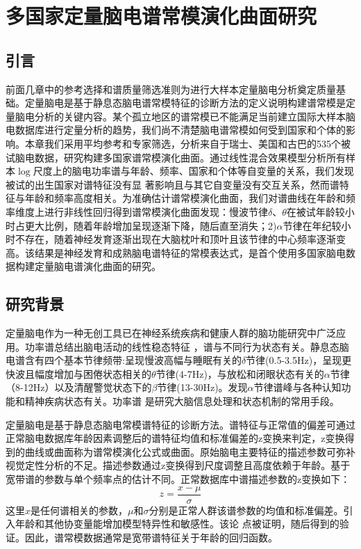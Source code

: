 \chapter{多国家定量脑电谱常模演化曲面研究}
\section{引言}
前面几章中的参考选择和谱质量筛选准则为进行大样本定量脑电分析奠定质量基础。定量脑电是基于静息态脑电谱常模特征的诊断方法的定义说明构建谱常模是定量脑电分析的关键内容。某个孤立地区的谱常模已不能满足当前建立国际大样本脑电数据库进行定量分析的趋势，我们尚不清楚脑电谱常模如何受到国家和个体的影响。本章我们采用平均参考和专家筛选，分析来自于瑞士、美国和古巴的535个被试脑电数据，研究构建多国家谱常模演化曲面。通过线性混合效果模型分析所有样本$\log$尺度上的脑电功率谱与年龄、频率、国家和个体等自变量的关系，我们发现被试的出生国家对谱特征没有显
著影响且与其它自变量没有交互关系，然而谱特征与年龄和频率高度相关。为准确估计谱常模演化曲面，我们对谱曲线在年龄和频率维度上进行非线性回归得到谱常模演化曲面发现：慢波节律$\delta$、$\theta$在被试年龄较小时占更大比例，随着年龄增加呈现逐渐下降，随后直至消失；2)$\alpha$节律在年纪较小时不存在，随着神经发育逐渐出现在大脑枕叶和顶叶且该节律的中心频率逐渐变高。该结果是神经发育和成熟脑电谱特征的常模表达式，是首个使用多国家脑电数据构建定量脑电谱演化曲面的研究。

\section{研究背景}
定量脑电作为一种无创工具已在神经系统疾病和健康人群的脑功能研究中广泛应用。功率谱总结出脑电活动的线性稳态特征
，谱与不同行为状态有关。静息态脑电谱含有四个基本节律频带:呈现慢波高幅与睡眠有关的$\delta$节律(0.5-3.5Hz)，呈现更快波且幅度增加与困倦状态相关的$\theta$节律(4-7Hz)，与放松和闭眼状态有关的$\alpha$节律（8-12Hz）以及清醒警觉状态下的$\beta$节律(13-30Hz)。\cite{john1988neurometrics,buzsaki2006rhythms}发现$\alpha$节律谱峰与各种认知功能和精神疾病状态有关。功率谱
是研究大脑信息处理和状态机制的常用手段。

定量脑电是基于静息态脑电常模谱特征的诊断方法。谱特征与正常值的偏差可通过正常脑电数据库年龄因素调整后的谱特征均值和标准偏差的z变换来判定，z变换得到的曲线或曲面称为谱常模演化公式或曲面。原始脑电主要特征的描述参数可弥补视觉定性分析的不足。描述参数通过z变换得到尺度调整且高度依赖于年龄。基于宽带谱的参数与单个频率点的估计不同。正常数据库中谱描述参数的z变换如下：
\[z=\frac{x-\mu}{\sigma}\]
这里$x$是任何谱相关的参数，$\mu$和$\sigma$分别是正常人群该谱参数的均值和标准偏差。引入年龄和其他协变量能增加模型特异性和敏感性。该论
点被\cite{john1980developmental}证明，随后得到\cite{matouvsek1973automatic,john1977neurometrics,alvarez1987eeg,amador1989structure}的验证。因此，谱常模数据通常是宽带谱特征关于年龄的回归函数。

